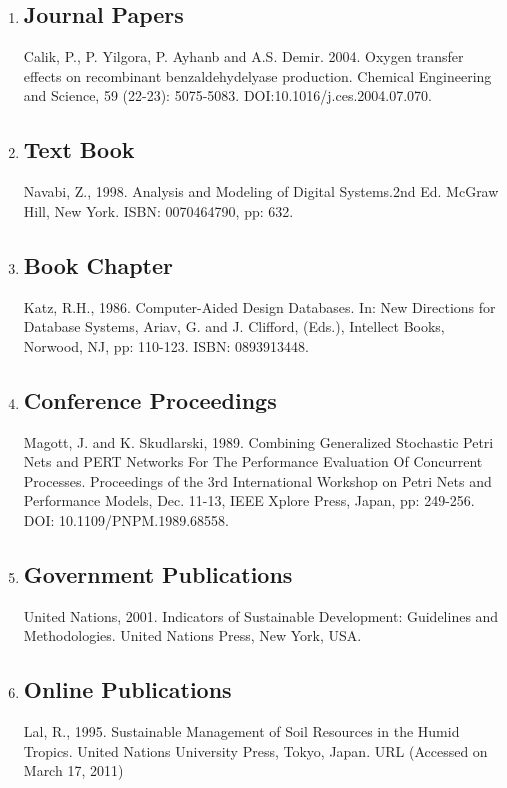 \documentclass[fleqn,10pt]{thescipub} %
\begin{document}
\begin{enumerate}
\item \subsection{Journal Papers}
Calik, P., P. Yilgora, P. Ayhanb and A.S. Demir. 2004. Oxygen transfer effects on recombinant benzaldehydelyase production. Chemical Engineering and Science, 59 (22-23): 5075-5083. DOI:10.1016/j.ces.2004.07.070.
\item \subsection{Text Book}
Navabi, Z., 1998. Analysis and Modeling of Digital Systems.2nd Ed. McGraw Hill, New York. ISBN: 0070464790, pp: 632.
\item \subsection{Book Chapter} Katz, R.H., 1986. Computer-Aided Design Databases. In: New Directions for Database Systems, Ariav, G. and J. Clifford, (Eds.), Intellect Books, Norwood, NJ, pp: 110-123. ISBN: 0893913448.
\item \subsection{Conference Proceedings} Magott, J. and K. Skudlarski, 1989. Combining Generalized Stochastic Petri Nets and PERT Networks For The Performance Evaluation Of Concurrent Processes. Proceedings of the 3rd International Workshop on Petri Nets and Performance Models, Dec. 11-13, IEEE Xplore Press, Japan, pp: 249-256. DOI: 10.1109/PNPM.1989.68558.
\item \subsection{Government Publications} United Nations, 2001. Indicators of Sustainable Development: Guidelines and Methodologies. United Nations Press, New York, USA.
\item \subsection{Online Publications} Lal, R., 1995. Sustainable Management of Soil Resources in the Humid Tropics. United Nations University Press, Tokyo, Japan. {URL} (Accessed on March 17, 2011)

\end{enumerate}
\end{document}
